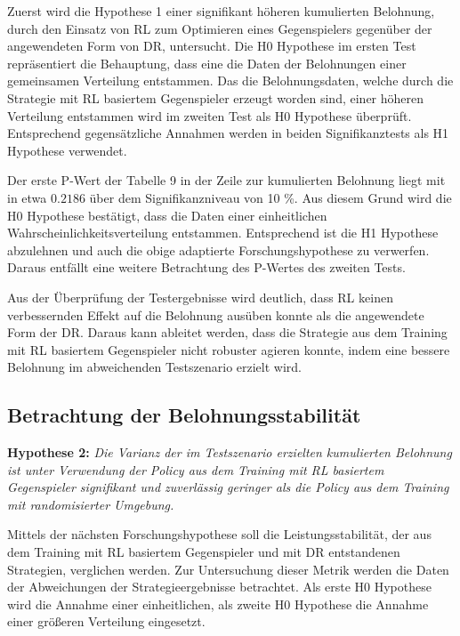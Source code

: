 Zuerst wird die Hypothese 1 einer signifikant höheren kumulierten Belohnung, durch den Einsatz von RL zum Optimieren eines Gegenspielers gegenüber der angewendeten Form von DR, untersucht.
Die H0 Hypothese im ersten Test repräsentiert die Behauptung, dass eine die Daten der Belohnungen einer gemeinsamen Verteilung entstammen. 
Das die Belohnungsdaten, welche durch die Strategie mit RL basiertem Gegenspieler erzeugt worden sind, einer höheren Verteilung entstammen wird im zweiten Test als H0 Hypothese überprüft.
Entsprechend gegensätzliche Annahmen werden in beiden Signifikanztests als H1 Hypothese verwendet.

Der erste P-Wert der Tabelle 9 in der Zeile zur kumulierten Belohnung liegt mit in etwa $0.2186$ über dem Signifikanzniveau von 10 \%.
Aus diesem Grund wird die H0 Hypothese bestätigt, dass die Daten einer einheitlichen Wahrscheinlichkeitsverteilung entstammen.
Entsprechend ist die H1 Hypothese abzulehnen und auch die obige adaptierte Forschungshypothese zu verwerfen.
Daraus entfällt eine weitere Betrachtung des P-Wertes des zweiten Tests.

Aus der Überprüfung der Testergebnisse wird deutlich, dass RL keinen verbessernden Effekt auf die Belohnung ausüben konnte als die angewendete Form der DR.
Daraus kann ableitet werden, dass die Strategie aus dem Training mit RL basiertem Gegenspieler nicht robuster agieren konnte, indem eine bessere Belohnung im abweichenden Testszenario erzielt wird.

\subsection{Betrachtung der Belohnungsstabilität}

\textbf{Hypothese 2:}
\textit{Die Varianz der im Testszenario erzielten kumulierten Belohnung ist unter Verwendung der Policy aus dem Training mit RL basiertem Gegenspieler signifikant und zuverlässig geringer als die Policy aus dem Training mit randomisierter Umgebung.}

Mittels der nächsten Forschungshypothese soll die Leistungsstabilität, der aus dem Training mit RL basiertem Gegenspieler und mit DR entstandenen Strategien, verglichen werden.
Zur Untersuchung dieser Metrik werden die Daten der Abweichungen der Strategieergebnisse betrachtet.
Als erste H0 Hypothese wird die Annahme einer einheitlichen, als zweite H0 Hypothese die Annahme einer größeren Verteilung eingesetzt.

